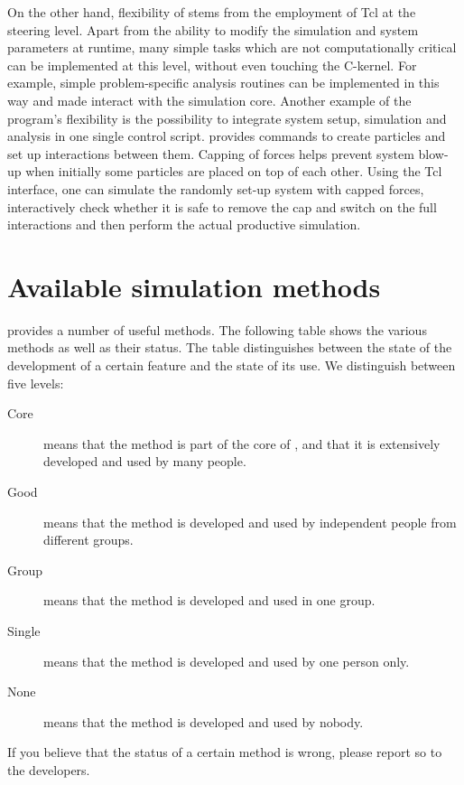 On the other hand, flexibility of \es stems from the employment of Tcl
at the steering level. Apart from the ability to modify the simulation
and system parameters at runtime, many simple tasks which are not
computationally critical can be implemented at this level, without
even touching the C-kernel.  For example, simple problem-specific
analysis routines can be implemented in this way and made interact
with the simulation core.  Another example of the program's
flexibility is the possibility to integrate system setup, simulation and
analysis in one single control script. \es provides commands to create
particles and set up interactions between them.  Capping of forces
helps prevent system blow-up when initially some particles are placed
on top of each other. Using the Tcl interface, one can simulate the
randomly set-up system with capped forces, interactively check whether
it is safe to remove the cap and switch on the full interactions and
then perform the actual productive simulation.

\section{Available simulation methods}

\es provides a number of useful methods. The following table shows the
various methods as well as their status. The table distinguishes
between the state of the development of a certain feature and the
state of its use. We distinguish between five levels:
\begin{description}
\item[Core] means that the method is part of the core of \es, and that
  it is extensively developed and used by many people.
\item[Good] means that the method is developed and used by independent
  people from different groups.
\item[Group] means that the method is developed and used in one group.
\item[Single] means that the method is developed and used by one
  person only.
\item[None] means that the method is developed and used by nobody.
\end{description}
If you believe that the status of a certain method is wrong, please
report so to the developers.


